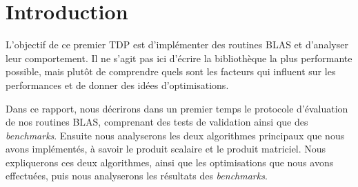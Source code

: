 \section*{Introduction}

L'objectif de ce premier TDP est d'implémenter des routines BLAS et d'analyser leur comportement. Il ne s'agit pas ici d'écrire la bibliothèque la plus performante possible, mais plutôt de comprendre quels sont les facteurs qui influent sur les performances et de donner des idées d'optimisations.

Dans ce rapport, nous décrirons dans un premier temps le protocole d'évaluation de nos routines BLAS, comprenant des tests de validation ainsi que des \emph{benchmarks}. Ensuite nous analyserons les deux algorithmes principaux que nous avons implémentés, à savoir le produit scalaire et le produit matriciel. Nous expliquerons ces deux algorithmes, ainsi que les optimisations que nous avons effectuées, puis nous analyserons les résultats des \emph{benchmarks}.





